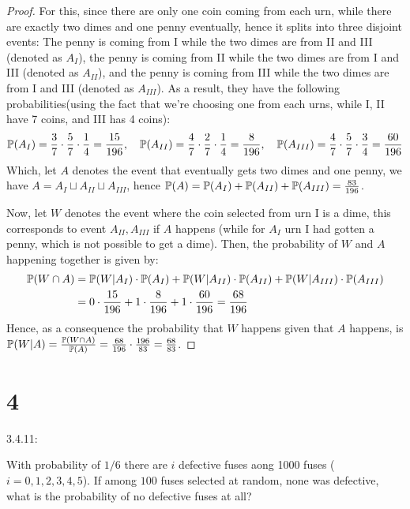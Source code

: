 \documentclass{article}
\begin{document}
\begin{proof}
    For this, since there are only one coin coming from each urn, while there are exactly two dimes and one penny eventually, hence it splits into three disjoint events: The penny is coming from I while the two dimes are from II and III (denoted as $A_I$), the penny is coming from II while the two dimes are from I and III (denoted as $A_{II}$), and the penny is coming from III while the two dimes are from I and III (denoted as $A_{III}$). As a result, they have the following probabilities(using the fact that we're choosing one from each urns, while I, II have 7 coins, and III has 4 coins):
    \begin{align}
        \mathbb{P}(A_I)=\frac{3}{7}\cdot\frac{5}{7}\cdot\frac{1}{4}=\frac{15}{196},\quad \mathbb{P}(A_{II})=\frac{4}{7}\cdot\frac{2}{7}\cdot\frac{1}{4}=\frac{8}{196},\quad \mathbb{P}(A_{III})=\frac{4}{7}\cdot\frac{5}{7}\cdot\frac{3}{4}=\frac{60}{196}
    \end{align}
    Which, let $A$ denotes the event that eventually gets two dimes and one penny, we have $A=A_I\sqcup A_{II}\sqcup A_{III}$, hence $\mathbb{P}(A)=\mathbb{P}(A_I)+\mathbb{P}(A_{II})+\mathbb{P}(A_{III})=\frac{83}{196}$.

    \hfil

    Now, let $W$ denotes the event where the coin selected from urn I is a dime, this corresponds to event $A_{II},A_{III}$ if $A$ happens (while for $A_I$ urn I had gotten a penny, which is not possible to get a dime). Then, the probability of $W$ and $A$ happening together is given by:
    \begin{align}
        \mathbb{P}(W \cap A)&=\mathbb{P}(W|A_I)\cdot \mathbb{P}(A_I)+\mathbb{P}(W|A_{II})\cdot\mathbb{P}(A_{II})+\mathbb{P}(W|A_{III})\cdot\mathbb{P}(A_{III})\\
        &= 0\cdot \frac{15}{196}+1\cdot\frac{8}{196}+1\cdot\frac{60}{196}=\frac{68}{196}
    \end{align}
    Hence, as a consequence the probability that $W$ happens given that $A$ happens, is $\mathbb{P}(W|A)=\frac{\mathbb{P}(W\cap A)}{\mathbb{P}(A)} = \frac{68}{196}\cdot\frac{196}{83} = \frac{68}{83}$.
\end{proof}

\newpage

\section*{4}
\begin{ques}\label{q4}
    3.4.11:

    With probability of $1/6$ there are $i$ defective fuses aong 1000 fuses ($i=0,1,2,3,4,5$). If among $100$ fuses selected at random, none was defective, what is the probability of no defective fuses at all?
\end{ques}
\end{document}
